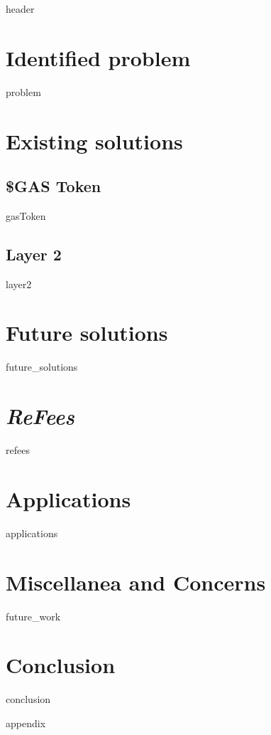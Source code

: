 \documentclass[conference]{IEEEtran}
\newcommand{\projectName}{\textit{ReFees}}
\begin{document}
{header}

\section{Identified problem}
{problem}
\section{Existing solutions}
\label{section:Existing_solutions}
\subsection{\$GAS Token}
{gasToken}
\subsection{Layer 2}
{layer2}

\section{Future solutions}
{future_solutions}
\section{\projectName}
{refees}
\section{Applications}
\label{section:Applications}
{applications}

\section{Miscellanea and Concerns}
{future_work}
\section{Conclusion}
{conclusion}

\appendices
{appendix}



\end{document}
